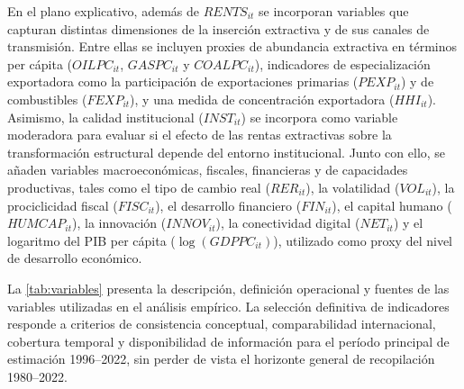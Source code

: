 \documentclass[../../PTFM.tex]{subfiles}
\begin{document}
En el plano explicativo, además de $RENTS_{it}$ se incorporan variables
que capturan distintas dimensiones de la inserción extractiva y de sus
canales de transmisión. Entre ellas se incluyen proxies de abundancia
extractiva en términos per cápita ($OILPC_{it}$, $GASPC_{it}$ y
$COALPC_{it}$), indicadores de especialización exportadora como la
participación de exportaciones primarias ($PEXP_{it}$) y de combustibles
($FEXP_{it}$), y una medida de concentración exportadora ($HHI_{it}$).
Asimismo, la calidad institucional ($INST_{it}$) se incorpora como
variable moderadora para evaluar si el efecto de las rentas extractivas
sobre la transformación estructural depende del entorno institucional.
Junto con ello, se añaden variables macroeconómicas, fiscales, financieras
y de capacidades productivas, tales como el tipo de cambio real
($RER_{it}$), la volatilidad ($VOL_{it}$), la prociclicidad fiscal
($FISC_{it}$), el desarrollo financiero ($FIN_{it}$), el capital humano
($HUMCAP_{it}$), la innovación ($INNOV_{it}$), la conectividad digital
($NET_{it}$) y el logaritmo del PIB per cápita ($\log(GDPPC_{it})$),
utilizado como proxy del nivel de desarrollo económico.

La \autoref{tab:variables} presenta la descripción, definición
operacional y fuentes de las variables utilizadas en el análisis
empírico. La selección definitiva de indicadores responde a criterios de
consistencia conceptual, comparabilidad internacional, cobertura temporal
y disponibilidad de información para el período principal de estimación
1996--2022, sin perder de vista el horizonte general de recopilación
1980--2022.
	\renewcommand{\arraystretch}{1.2}
	\setlength{\tabcolsep}{4pt}
\end{document}
